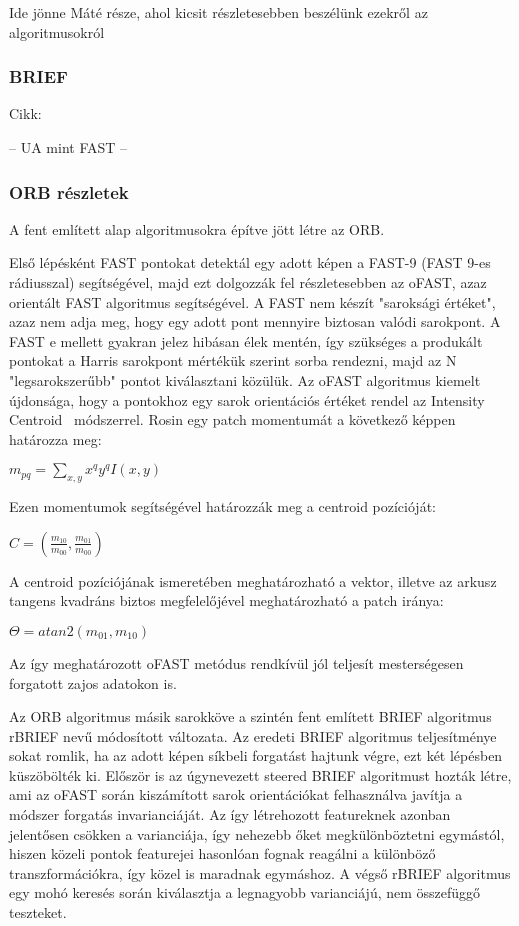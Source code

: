 Ide jönne Máté része, ahol kicsit részletesebben beszélünk ezekről az algoritmusokról

\subsubsection{BRIEF}

Cikk:\cite{rublee2011orb}

-- UA mint FAST --

\subsubsection{ORB részletek}

A fent említett alap algoritmusokra építve jött létre az ORB.

Első lépésként FAST pontokat detektál egy adott képen a FAST-9 (FAST 9-es rádiusszal) segítségével, majd ezt dolgozzák fel részletesebben az oFAST, azaz orientált FAST algoritmus segítségével.
A FAST nem készít "saroksági értéket", azaz nem adja meg, hogy egy adott pont mennyire biztosan valódi sarokpont.
A FAST e mellett gyakran jelez hibásan élek mentén, így szükséges a produkált pontokat a Harris sarokpont mértékük szerint sorba rendezni, majd az N "legsarokszerűbb" pontot kiválasztani közülük.
Az oFAST algoritmus kiemelt újdonsága, hogy a pontokhoz egy sarok orientációs értéket rendel az Intensity Centroid~\cite{rosin1999measuring} módszerrel.
Rosin egy patch momentumát a következő képpen határozza meg:

$ m_{pq} = \sum_{x,y}^{}x^{q}y^{q}I(x,y) $

Ezen momentumok segítségével határozzák meg a centroid pozícióját:

$ C = (\frac{m_{10}}{m_{00}},\frac{m_{01}}{m_{00}}) $

A centroid pozíciójának ismeretében meghatározható a vektor, illetve az arkusz tangens kvadráns biztos megfelelőjével meghatározható a patch iránya:

$ \Theta = atan2(m_{01},m_{10}) $

Az így meghatározott oFAST metódus rendkívül jól teljesít mesterségesen forgatott zajos adatokon is.

Az ORB algoritmus másik sarokköve a szintén fent említett BRIEF algoritmus rBRIEF nevű módosított változata.
Az eredeti BRIEF algoritmus teljesítménye sokat romlik, ha az adott képen síkbeli forgatást hajtunk végre, ezt két lépésben küszöbölték ki.
Először is az úgynevezett steered BRIEF algoritmust hozták létre, ami az oFAST során kiszámított sarok orientációkat felhasználva javítja a módszer forgatás invarianciáját.
Az így létrehozott featureknek azonban jelentősen csökken a varianciája, így nehezebb őket megkülönböztetni egymástól, hiszen közeli pontok featurejei hasonlóan fognak reagálni a különböző transzformációkra, így közel is maradnak egymáshoz.
A végső rBRIEF algoritmus egy mohó keresés során kiválasztja a legnagyobb varianciájú, nem összefüggő teszteket.


